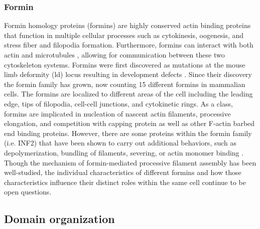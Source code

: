 \subsubsection{Formin}

Formin homology proteins (formins) are highly conserved actin binding proteins that function in multiple cellular processes such as cytokinesis, oogenesis, and stress fiber and filopodia formation. Furthermore, formins can interact with both actin and microtubules \citep{bartolini_formin_2008,henty-ridilla_accelerated_2016}, allowing for communication between these two cytoskeleton systems. Formins were first discovered as mutations at the mouse limb deformity (ld) locus resulting in development defects \citep{woychik_formins:_1990}. Since their discovery the formin family has grown, now counting 15 different formins in mammalian cells. The formins are localized to different areas of the cell including the leading edge, tips of filopodia, cell-cell junctions, and cytokinetic rings. As a class, formins are implicated in nucleation of nascent actin filaments, processive elongation, and competition with capping protein as well as other F-actin barbed end binding proteins. However, there are some proteins within the formin family (i.e. INF2) that have been shown to carry out additional behaviors, such as depolymerization, bundling of filaments, severing, or actin monomer binding \citep{gurel_assembly_2015}. Though the mechanism of formin-mediated processive filament assembly has been well-studied, the individual characteristics of different formins and how those characteristics influence their distinct roles within the same cell continue to be open questions. 

\subsection{Domain organization}\label{ena-formin-domains}

